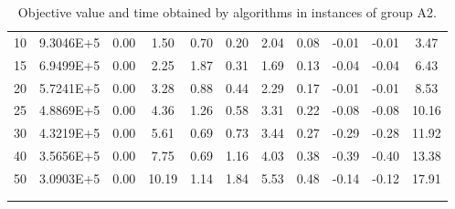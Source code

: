 {\begin{longtable}{@{}llccccccccc@{}}
\multicolumn{1}{l|}{10} & \multicolumn{1}{l|}{9.3046E+5}  & 0.00 & \multicolumn{1}{c|}{1.50}  & 0.70  & \multicolumn{1}{c|}{0.20} & 2.04  & \multicolumn{1}{c|}{0.08} & -0.01     & -0.01     & 3.47  \\
\multicolumn{1}{l|}{15} & \multicolumn{1}{l|}{6.9499E+5}  & 0.00 & \multicolumn{1}{c|}{2.25}  & 1.87  & \multicolumn{1}{c|}{0.31} & 1.69  & \multicolumn{1}{c|}{0.13} & -0.04     & -0.04     & 6.43  \\
\multicolumn{1}{l|}{20} & \multicolumn{1}{l|}{5.7241E+5}  & 0.00 & \multicolumn{1}{c|}{3.28}  & 0.88  & \multicolumn{1}{c|}{0.44} & 2.29  & \multicolumn{1}{c|}{0.17} & -0.01     & -0.01     & 8.53  \\
\multicolumn{1}{l|}{25} & \multicolumn{1}{l|}{4.8869E+5}  & 0.00 & \multicolumn{1}{c|}{4.36}  & 1.26  & \multicolumn{1}{c|}{0.58} & 3.31  & \multicolumn{1}{c|}{0.22} & -0.08     & -0.08     & 10.16 \\
\multicolumn{1}{l|}{30} & \multicolumn{1}{l|}{4.3219E+5}  & 0.00 & \multicolumn{1}{c|}{5.61}  & 0.69  & \multicolumn{1}{c|}{0.73} & 3.44  & \multicolumn{1}{c|}{0.27} & -0.29     & -0.28     & 11.92 \\
\multicolumn{1}{l|}{40} & \multicolumn{1}{l|}{3.5656E+5}  & 0.00 & \multicolumn{1}{c|}{7.75}  & 0.69  & \multicolumn{1}{c|}{1.16} & 4.03  & \multicolumn{1}{c|}{0.38} & -0.39     & -0.40     & 13.38 \\
\multicolumn{1}{l|}{50} & \multicolumn{1}{l|}{3.0903E+5}  & 0.00 & \multicolumn{1}{c|}{10.19} & 1.14  & \multicolumn{1}{c|}{1.84} & 5.53  & \multicolumn{1}{c|}{0.48} & -0.14     & -0.12     & 17.91 \\ \hline
\caption{Objective value and time obtained by algorithms in instances of group A2.}\\
\label{results-all-A2}\\
\end{longtable}}